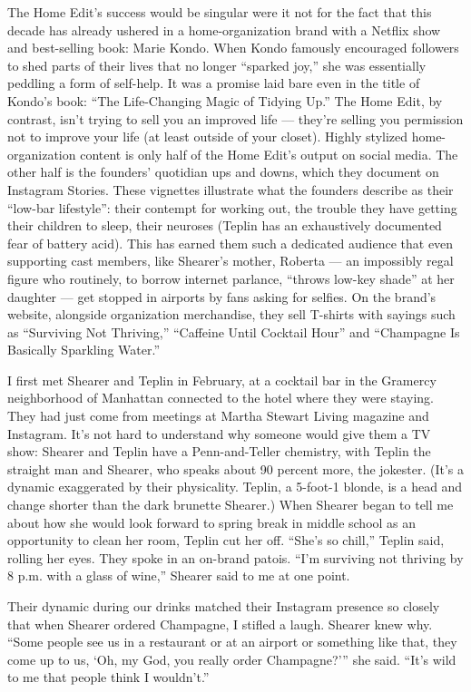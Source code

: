 The Home Edit's success would be singular were it not for the fact that
this decade has already ushered in a home-organization brand with a
Netflix show and best-selling book: Marie Kondo. When Kondo famously
encouraged followers to shed parts of their lives that no longer
``sparked joy,'' she was essentially peddling a form of self-help. It
was a promise laid bare even in the title of Kondo's book: ``The
Life-Changing Magic of Tidying Up.'' The Home Edit, by contrast, isn't
trying to sell you an improved life --- they're selling you permission
not to improve your life (at least outside of your closet). Highly
stylized home-organization content is only half of the Home Edit's
output on social media. The other half is the founders' quotidian ups
and downs, which they document on Instagram Stories. These vignettes
illustrate what the founders describe as their ``low-bar lifestyle'':
their contempt for working out, the trouble they have getting their
children to sleep, their neuroses (Teplin has an exhaustively documented
fear of battery acid). This has earned them such a dedicated audience
that even supporting cast members, like Shearer's mother, Roberta --- an
impossibly regal figure who routinely, to borrow internet parlance,
``throws low-key shade'' at her daughter --- get stopped in airports by
fans asking for selfies. On the brand's website, alongside organization
merchandise, they sell T-shirts with sayings such as ``Surviving Not
Thriving,'' ``Caffeine Until Cocktail Hour'' and ``Champagne Is
Basically Sparkling Water.''

I first met Shearer and Teplin in February, at a cocktail bar in the
Gramercy neighborhood of Manhattan connected to the hotel where they
were staying. They had just come from meetings at Martha Stewart Living
magazine and Instagram. It's not hard to understand why someone would
give them a TV show: Shearer and Teplin have a Penn-and-Teller
chemistry, with Teplin the straight man and Shearer, who speaks about 90
percent more, the jokester. (It's a dynamic exaggerated by their
physicality. Teplin, a 5-foot-1 blonde, is a head and change shorter
than the dark brunette Shearer.) When Shearer began to tell me about how
she would look forward to spring break in middle school as an
opportunity to clean her room, Teplin cut her off. ``She's so chill,''
Teplin said, rolling her eyes. They spoke in an on-brand patois. ``I'm
surviving not thriving by 8 p.m. with a glass of wine,'' Shearer said to
me at one point.

Their dynamic during our drinks matched their Instagram presence so
closely that when Shearer ordered Champagne, I stifled a laugh. Shearer
knew why. ``Some people see us in a restaurant or at an airport or
something like that, they come up to us, `Oh, my God, you really order
Champagne?''' she said. ``It's wild to me that people think I
wouldn't.''

